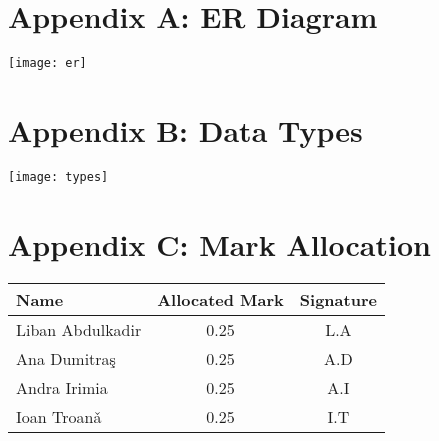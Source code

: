 \documentclass{article}
\newcounter{homeworkProblemCounter} %
\newcommand{\homeworkProblemName}{}
\newenvironment{homeworkProblem}[1][Question \arabic{homeworkProblemCounter}]{ %
\stepcounter{homeworkProblemCounter} %
\renewcommand{\homeworkProblemName}{#1} %
\subsection{\homeworkProblemName} %
}{}
\begin{document}
\chapter{\textbf{Appendix A: ER Diagram}}
\begin{center}
\texttt{[image: er]} %
\end{center}

\chapter{\textbf{Appendix B: Data Types}}
\begin{center}
\texttt{[image: types]} %
\end{center}

\chapter{\textbf{Appendix C: Mark Allocation}}
\begin{center}
    \begin{tabular}{| l | c | c |}
    \hline
    \textbf{Name} & \textbf{Allocated Mark} & \textbf{Signature} \\ \hline
    Liban Abdulkadir & 0.25 & L.A \\ \hline
    Ana Dumitra\c{s} & 0.25 & A.D \\ \hline
    Andra Irimia & 0.25 & A.I \\ \hline
    Ioan Troan\v{a} & 0.25 & I.T \\ \hline
    \end{tabular}
\end{center}









\end{document}
